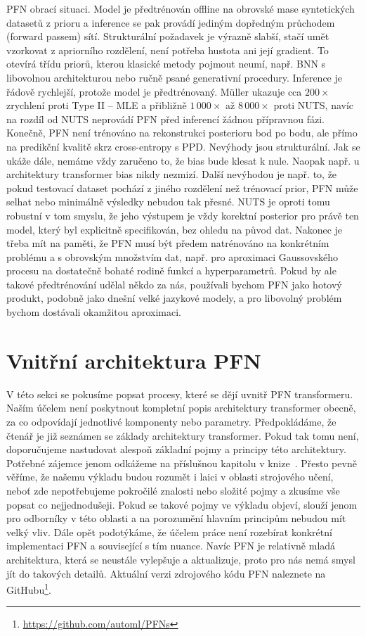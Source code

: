 PFN obrací situaci.
Model je předtrénován offline na obrovské mase syntetických datasetů z prioru a inference se pak provádí jediným dopředným průchodem (forward passem) sítí. 
Strukturální požadavek je výrazně slabší, stačí umět vzorkovat z apriorního rozdělení, není potřeba hustota ani její gradient. 
To otevírá třídu priorů, kterou klasické metody pojmout neumí, např. BNN s libovolnou architekturou nebo ručně psané generativní procedury. 
Inference je řádově rychlejší, protože model je předtrénovaný.
Müller ukazuje cca $200\times$ zrychlení proti Type II – MLE a přibližně $1\,000\times$ až $8\,000\times$ proti NUTS, navíc na rozdíl od NUTS neprovádí PFN před inferencí žádnou přípravnou fázi. 
Konečně, PFN není trénováno na rekonstrukci posterioru bod po bodu, ale přímo na predikční kvalitě skrz cross-entropy s PPD. 
Nevýhody jsou strukturální. 
Jak se ukáže dále, nemáme vždy zaručeno to, že bias bude klesat k nule. 
Naopak např. u architektury transformer bias nikdy nezmizí.
Další nevýhodou je např. to, že pokud testovací dataset pochází z jiného rozdělení než trénovací prior, PFN může selhat nebo minimálně výsledky nebudou tak přesné. 
NUTS je oproti tomu robustní v tom smyslu, že jeho výstupem je vždy korektní posterior pro právě ten model, který byl explicitně specifikován, bez ohledu na původ dat. 
Nakonec je třeba mít na paměti, že PFN musí být předem natrénováno na konkrétním problému a s obrovským množstvím dat, např. pro aproximaci Gaussovského procesu na dostatečně bohaté rodině funkcí a hyperparametrů.
Pokud by ale takové předtrénování udělal někdo za nás, používali bychom PFN jako hotový produkt, podobně jako dnešní velké jazykové modely, a pro libovolný problém bychom dostávali okamžitou aproximaci.

\section{Vnitřní architektura PFN}
\label{sec:pfn-architektura}

V této sekci se pokusíme popsat procesy, které se dějí uvnitř PFN transformeru.
Naším účelem není poskytnout kompletní popis architektury transformer obecně, za co odpovídají jednotlivé komponenty nebo parametry.
Předpokládáme, že čtenář je již seznámen se základy architektury transformer.
Pokud tak tomu není, doporučujeme nastudovat alespoň základní pojmy a principy této architektury. 
Potřebné zájemce jenom odkážeme na příslušnou kapitolu v knize~\cite{prince2023}.
Přesto pevně věříme, že našemu výkladu budou rozumět i laici v oblasti strojového učení, neboť zde nepotřebujeme pokročilé znalosti nebo složité pojmy a zkusíme vše popsat co nejjednodušeji.
Pokud se takové pojmy ve výkladu objeví, slouží jenom pro odborníky v této oblasti a na porozumění hlavním principům nebudou mít velký vliv. 
Dále opět podotýkáme, že účelem práce není rozebírat konkrétní implementaci PFN a související s tím nuance.
Navíc PFN je relativně mladá architektura, která se neustále vylepšuje a aktualizuje, proto pro nás nemá smysl jít do takových detailů.
Aktuální verzi zdrojového kódu PFN naleznete na GitHubu\footnote{\url{https://github.com/automl/PFNs}}.
\par 


